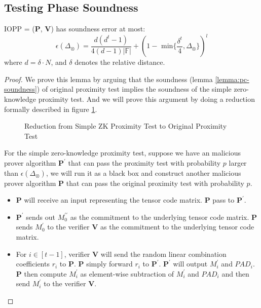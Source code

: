 \subsection{Testing Phase Soundness}

\begin{lemma}
\label{lemma:szkpctc-soundness}


IOPP = ($\textbf{P}$, $\textbf{V}$) has soundness error at most:
$$
    \epsilon(\Delta_\otimes) = \frac{d(d^t-1)}{4(d-1)|\mathbb{F}|} + (1 - \text{ min}\{\frac{\delta^t}{4}, \Delta_\otimes \})^l
$$
where $d = \delta \cdot N$, and $\delta$ denotes the relative distance.

\end{lemma}
\begin{proof}

We prove this lemma by arguing that the soundness (lemma \ref{lemma:pc-soundness}) of original proximity test implies the soundness of the simple zero-knowledge proximity test. And we will prove this argument by doing a reduction formally described in figure \ref{img:red-soundness}.

\begin{figure}[ht]
\centering
\resizebox{\textwidth}{!}{

}
\caption{Reduction from Simple ZK Proximity Test to Original Proximity Test}
\label{img:red-soundness}
\end{figure}

For the simple zero-knowledge proximity test, suppose we have an malicious prover algorithm $\textbf{P}^\prime$ that can pass the proximity test with probability $p$ larger than $\epsilon(\Delta_\otimes)$, we will run it as a black box and construct another malicious prover algorithm $\textbf{P}$ that can pass the original proximity test with probability $p$.

\begin{itemize}
    \item $\textbf{P}$ will receive an input \mzeroprime representing the tensor code matrix. \textbf{P} pass \mzeroprime to $\textbf{P}^\prime$.
    \item $\textbf{P}^\prime$ sends out $M_0^{\prime\prime}$ as the commitment to the underlying tensor code matrix. \textbf{P} sends $M_0^\prime$ to the verifier \textbf{V}  as the commitment to the underlying tensor code matrix.
    \item For $i \in [t-1]$, verifier \textbf{V} will send the random linear combination coefficients $r_i$ to \textbf{P}. \textbf{P} simply forward $r_i$ to $\textbf{P}^\prime$. $\textbf{P}^\prime$ will output $M_i^\prime$ and $PAD_i$. \textbf{P} then compute $M_i^\prime$ as element-wise subtraction of $M_i^\prime$ and $PAD_i$ and then send $M_i^\prime$ to the verifier \textbf{V}. 
    

\end{itemize}
\end{proof}
